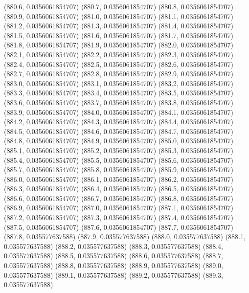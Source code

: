 {					(880.6, 0.0356061854707)
					(880.7, 0.0356061854707)
					(880.8, 0.0356061854707)
					(880.9, 0.0356061854707)
					(881.0, 0.0356061854707)
					(881.1, 0.0356061854707)
					(881.2, 0.0356061854707)
					(881.3, 0.0356061854707)
					(881.4, 0.0356061854707)
					(881.5, 0.0356061854707)
					(881.6, 0.0356061854707)
					(881.7, 0.0356061854707)
					(881.8, 0.0356061854707)
					(881.9, 0.0356061854707)
					(882.0, 0.0356061854707)
					(882.1, 0.0356061854707)
					(882.2, 0.0356061854707)
					(882.3, 0.0356061854707)
					(882.4, 0.0356061854707)
					(882.5, 0.0356061854707)
					(882.6, 0.0356061854707)
					(882.7, 0.0356061854707)
					(882.8, 0.0356061854707)
					(882.9, 0.0356061854707)
					(883.0, 0.0356061854707)
					(883.1, 0.0356061854707)
					(883.2, 0.0356061854707)
					(883.3, 0.0356061854707)
					(883.4, 0.0356061854707)
					(883.5, 0.0356061854707)
					(883.6, 0.0356061854707)
					(883.7, 0.0356061854707)
					(883.8, 0.0356061854707)
					(883.9, 0.0356061854707)
					(884.0, 0.0356061854707)
					(884.1, 0.0356061854707)
					(884.2, 0.0356061854707)
					(884.3, 0.0356061854707)
					(884.4, 0.0356061854707)
					(884.5, 0.0356061854707)
					(884.6, 0.0356061854707)
					(884.7, 0.0356061854707)
					(884.8, 0.0356061854707)
					(884.9, 0.0356061854707)
					(885.0, 0.0356061854707)
					(885.1, 0.0356061854707)
					(885.2, 0.0356061854707)
					(885.3, 0.0356061854707)
					(885.4, 0.0356061854707)
					(885.5, 0.0356061854707)
					(885.6, 0.0356061854707)
					(885.7, 0.0356061854707)
					(885.8, 0.0356061854707)
					(885.9, 0.0356061854707)
					(886.0, 0.0356061854707)
					(886.1, 0.0356061854707)
					(886.2, 0.0356061854707)
					(886.3, 0.0356061854707)
					(886.4, 0.0356061854707)
					(886.5, 0.0356061854707)
					(886.6, 0.0356061854707)
					(886.7, 0.0356061854707)
					(886.8, 0.0356061854707)
					(886.9, 0.0356061854707)
					(887.0, 0.0356061854707)
					(887.1, 0.0356061854707)
					(887.2, 0.0356061854707)
					(887.3, 0.0356061854707)
					(887.4, 0.0356061854707)
					(887.5, 0.0356061854707)
					(887.6, 0.0356061854707)
					(887.7, 0.0356061854707)
					(887.8, 0.035577637588)
					(887.9, 0.035577637588)
					(888.0, 0.035577637588)
					(888.1, 0.035577637588)
					(888.2, 0.035577637588)
					(888.3, 0.035577637588)
					(888.4, 0.035577637588)
					(888.5, 0.035577637588)
					(888.6, 0.035577637588)
					(888.7, 0.035577637588)
					(888.8, 0.035577637588)
					(888.9, 0.035577637588)
					(889.0, 0.035577637588)
					(889.1, 0.035577637588)
					(889.2, 0.035577637588)
					(889.3, 0.035577637588)
}
